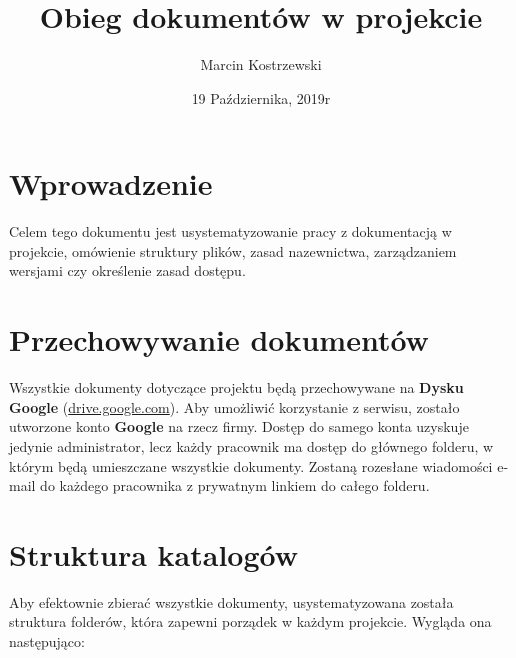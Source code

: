 \documentclass{article}
\title{Obieg dokumentów w projekcie}
\author{Marcin Kostrzewski}
\date{19 Października, 2019r}
\begin{document}
    
\maketitle

\newpage
\tableofcontents

\newpage
\section{Wprowadzenie}
Celem tego dokumentu jest usystematyzowanie pracy z dokumentacją
w projekcie, omówienie struktury plików, zasad nazewnictwa,
zarządzaniem wersjami czy określenie zasad dostępu.

\section{Przechowywanie dokumentów}
Wszystkie dokumenty dotyczące projektu będą przechowywane na \textbf{Dysku Google}
(\url{drive.google.com}).
Aby umożliwić korzystanie z serwisu, zostało utworzone konto \textbf{Google}
na rzecz firmy. Dostęp do samego konta uzyskuje jedynie administrator, lecz każdy
pracownik ma dostęp do głównego folderu, w którym będą umieszczane wszystkie dokumenty.
Zostaną rozesłane wiadomości e-mail do każdego pracownika z prywatnym linkiem do 
całego folderu.

\section{Struktura katalogów}
Aby efektownie zbierać wszystkie dokumenty, usystematyzowana została struktura folderów,
która zapewni porządek w każdym projekcie. Wygląda ona następująco:
\newline
\end{document}
